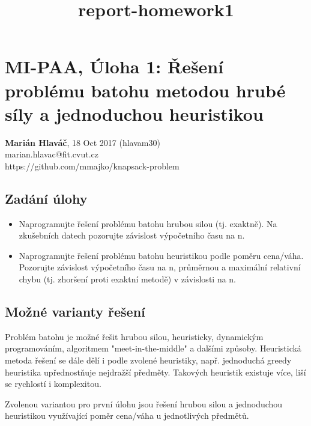 \documentclass[11pt]{article}
\title{report-homework1}
\providecommand{\tightlist}{%
      \setlength{\itemsep}{0pt}\setlength{\parskip}{0pt}}
\begin{document}
    
    
    \maketitle
    
    

    
    \section{MI-PAA, Úloha 1: Řešení problému batohu metodou hrubé síly a
jednoduchou
heuristikou}\label{mi-paa-uxfaloha-1-ux159eux161enuxed-probluxe9mu-batohu-metodou-hrubuxe9-suxedly-a-jednoduchou-heuristikou}

\textbf{Marián Hlaváč}, 18 Oct 2017 (hlavam30)\\
marian.hlavac@fit.cvut.cz\\
https://github.com/mmajko/knapsack-problem

\subsection{Zadání úlohy}\label{zaduxe1nuxed-uxfalohy}

\begin{itemize}
\tightlist
\item
  Naprogramujte řešení problému batohu hrubou silou (tj. exaktně). Na
  zkušebních datech pozorujte závislost výpočetního času na n.
\item
  Naprogramujte řešení problému batohu heuristikou podle poměru
  cena/váha. Pozorujte závislost výpočetního času na n, průměrnou a
  maximální relativní chybu (tj. zhoršení proti exaktní metodě) v
  závislosti na n.
\end{itemize}

    \subsection{Možné varianty
řešení}\label{moux17enuxe9-varianty-ux159eux161enuxed}

Problém batohu je možné řešit hrubou silou, heuristicky, dynamickým
programováním, algoritmem "meet-in-the-middle" a dalšími způsoby.
Heuristická metoda řešení se dále dělí i podle zvolené heuristiky, např.
jednoduchá greedy heuristika upřednostňuje nejdražší předměty. Takových
heuristik existuje více, liší se rychlostí i komplexitou.

Zvolenou variantou pro první úlohu jsou řešení hrubou silou a
jednoduchou heuristikou využívající poměr cena/váha u jednotlivých
předmětů.
\end{document}
